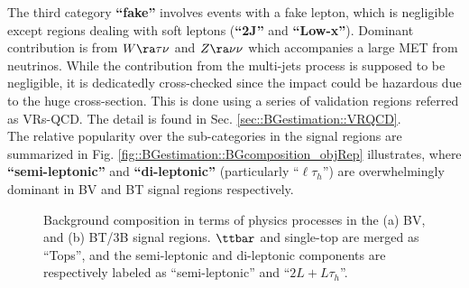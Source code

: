 The third category \textbf{``fake''} involves events with a fake lepton, which is negligible except regions dealing with soft leptons (\textbf{``2J''} and \textbf{``Low-x''}). Dominant contribution is from $W\ra\tau\nu$ and $Z\ra\nu\nu$ which accompanies a large MET from neutrinos. While the contribution from the multi-jets process is supposed to be negligible, it is dedicatedly cross-checked since the impact could be hazardous due to the huge cross-section. This is done using a series of validation regions referred as VRs-QCD. The detail is found in Sec. \ref{sec::BGestimation::VRQCD}. \\

The relative popularity over the sub-categories in the signal regions are summarized in Fig. \ref{fig::BGestimation::BGcomposition_objRep} illustrates, where \textbf{``semi-leptonic''} and \textbf{``di-leptonic''} (particularly ``$\ell\tau_h$'') are overwhelmingly dominant in BV and BT signal regions respectively.


\clearpage
\begin{figure}[h]
  \centering
    \caption{ Background composition in terms of physics processes in the (a) BV, and (b) BT/3B signal regions. $\ttbar$ and single-top are merged as ``Tops'', and the semi-leptonic and di-leptonic components are respectively labeled as ``semi-leptonic'' and ``$2L+L\tau_h$''. \label{fig::BGestimation::BGcomposition_splitLv2} }
\end{figure}

